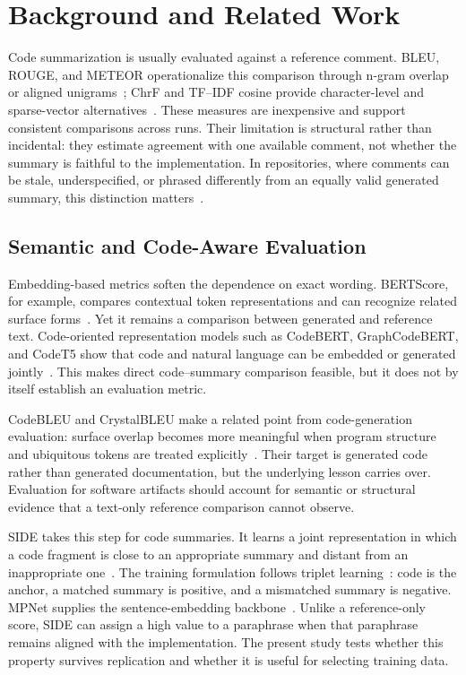 \documentclass[conference]{IEEEtran}
\begin{document}
\section{Background and Related Work}

Code summarization is usually evaluated against a reference comment. BLEU, ROUGE, and METEOR operationalize this comparison through n-gram overlap or aligned unigrams~\cite{papineni2002bleu,lin2004rouge,banerjee2005meteor}; ChrF and TF--IDF cosine provide character-level and sparse-vector alternatives~\cite{popovic2015chrf,ramos2003using}. These measures are inexpensive and support consistent comparisons across runs. Their limitation is structural rather than incidental: they estimate agreement with one available comment, not whether the summary is faithful to the implementation. In repositories, where comments can be stale, underspecified, or phrased differently from an equally valid generated summary, this distinction matters~\cite{roy2021reassessing,shi2022evaluation,mastropaolo2024evaluating}.

\subsection{Semantic and Code-Aware Evaluation}

Embedding-based metrics soften the dependence on exact wording. BERTScore, for example, compares contextual token representations and can recognize related surface forms~\cite{zhang2019bertscore}. Yet it remains a comparison between generated and reference text. Code-oriented representation models such as CodeBERT, GraphCodeBERT, and CodeT5 show that code and natural language can be embedded or generated jointly~\cite{feng2020codebert,guo2021graphcodebert,wang2021codet5,wang2023codet5plus}. This makes direct code--summary comparison feasible, but it does not by itself establish an evaluation metric.

CodeBLEU and CrystalBLEU make a related point from code-generation evaluation: surface overlap becomes more meaningful when program structure and ubiquitous tokens are treated explicitly~\cite{ren2020codebleu,eghbali2022crystalbleu}. Their target is generated code rather than generated documentation, but the underlying lesson carries over. Evaluation for software artifacts should account for semantic or structural evidence that a text-only reference comparison cannot observe.

SIDE takes this step for code summaries. It learns a joint representation in which a code fragment is close to an appropriate summary and distant from an inappropriate one~\cite{mastropaolo2024evaluating}. The training formulation follows triplet learning~\cite{schroff2015facenet}: code is the anchor, a matched summary is positive, and a mismatched summary is negative. MPNet supplies the sentence-embedding backbone~\cite{song2020mpnet}. Unlike a reference-only score, SIDE can assign a high value to a paraphrase when that paraphrase remains aligned with the implementation. The present study tests whether this property survives replication and whether it is useful for selecting training data.
\end{document}
